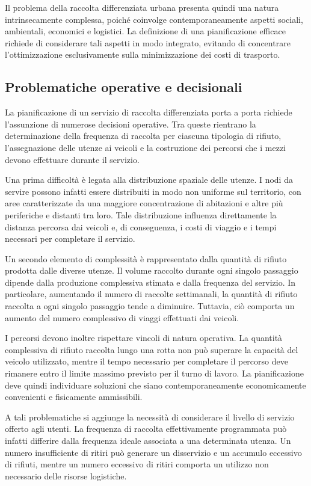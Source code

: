 Il problema della raccolta differenziata urbana presenta quindi una natura intrinsecamente complessa, poiché coinvolge contemporaneamente aspetti sociali, ambientali, economici e logistici. La definizione di una pianificazione efficace richiede di considerare tali aspetti in modo integrato, evitando di concentrare l'ottimizzazione esclusivamente sulla minimizzazione dei costi di trasporto.


\subsection{Problematiche operative e decisionali}

La pianificazione di un servizio di raccolta differenziata porta a porta richiede l'assunzione di numerose decisioni operative. Tra queste rientrano la determinazione della frequenza di raccolta per ciascuna tipologia di rifiuto, l'assegnazione delle utenze ai veicoli e la costruzione dei percorsi che i mezzi devono effettuare durante il servizio.

Una prima difficoltà è legata alla distribuzione spaziale delle utenze. I nodi da servire possono infatti essere distribuiti in modo non uniforme sul territorio, con aree caratterizzate da una maggiore concentrazione di abitazioni e altre più periferiche e distanti tra loro. Tale distribuzione influenza direttamente la distanza percorsa dai veicoli e, di conseguenza, i costi di viaggio e i tempi necessari per completare il servizio.

Un secondo elemento di complessità è rappresentato dalla quantità di rifiuto prodotta dalle diverse utenze. Il volume raccolto durante ogni singolo passaggio dipende dalla produzione complessiva stimata e dalla frequenza del servizio. In particolare, aumentando il numero di raccolte settimanali, la quantità di rifiuto raccolta a ogni singolo passaggio tende a diminuire. Tuttavia, ciò comporta un aumento del numero complessivo di viaggi effettuati dai veicoli.

I percorsi devono inoltre rispettare vincoli di natura operativa. La quantità complessiva di rifiuto raccolta lungo una rotta non può superare la capacità del veicolo utilizzato, mentre il tempo necessario per completare il percorso deve rimanere entro il limite massimo previsto per il turno di lavoro. La pianificazione deve quindi individuare soluzioni che siano contemporaneamente economicamente convenienti e fisicamente ammissibili.

A tali problematiche si aggiunge la necessità di considerare il livello di servizio offerto agli utenti. La frequenza di raccolta effettivamente programmata può infatti differire dalla frequenza ideale associata a una determinata utenza. Un numero insufficiente di ritiri può generare un disservizio e un accumulo eccessivo di rifiuti, mentre un numero eccessivo di ritiri comporta un utilizzo non necessario delle risorse logistiche.

